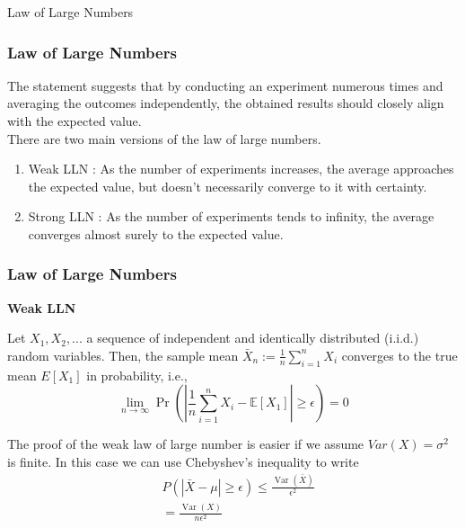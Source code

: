 \documentclass[
	10pt, %
]{beamer}
\begin{document}
\begin{frame}
	Law of Large Numbers
\end{frame}
\begin{frame}
    \frametitle{Law of Large Numbers}
    The statement suggests that by conducting an experiment numerous times and averaging the outcomes independently, the obtained results should closely align with the expected value.\\
    There are two main versions of the law of large numbers.\\
    \bigskip
    \begin{enumerate}
        \item Weak LLN : As the number of experiments increases, the average approaches the expected value, but doesn't necessarily converge to it with certainty. 
        \item Strong LLN :  As the number of experiments tends to infinity, the average converges almost surely to the expected value.
    \end{enumerate}
    
\end{frame}

\begin{frame}
    \frametitle{Law of Large Numbers}
\textbf{Weak LLN}
    \begin{definition}
        Let $X_1, X_2, ... $ a sequence of independent and identically distributed (i.i.d.) random variables. Then, the sample mean $\bar{X}_n:=\frac{1}{n} \sum_{i=1}^n X_i$ converges to the true mean $E[X_1]$ in probability, i.e.,
    \begin{equation*}
    \lim _{n \rightarrow \infty} \operatorname{Pr}\left(\left|\frac{1}{n} \sum_{i=1}^n X_i-\mathbb{E}\left[X_1\right]\right| \geq \epsilon\right)=0
    \end{equation*}
    \end{definition}

    The proof of the weak law of large number is easier if we assume $Var(X) = \sigma^2 $ is finite. In this case we can use Chebyshev's inequality to write
    \begin{equation*}
    \begin{aligned}
    & P(|\bar{X}-\mu| \geq \epsilon) \leq \frac{\operatorname{Var}(\bar{X})}{\epsilon^2} \\
    & =\frac{\operatorname{Var}(X)}{n \epsilon^2}
    \end{aligned}
    \end{equation*}
 
\end{frame}
\end{document}
